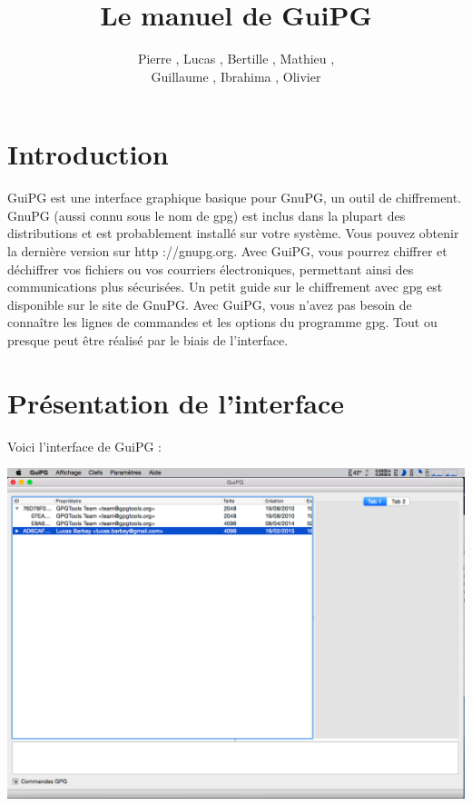 \documentclass[a4paper,11pt,french]{article}
\begin{document}
\title{Le manuel de GuiPG}
\author{Pierre , Lucas , Bertille , Mathieu , \\ Guillaume , Ibrahima , Olivier }
\maketitle

\normalsize
\clearpage
\tableofcontents
\clearpage

\section{Introduction}

GuiPG est une interface graphique basique pour GnuPG, un outil de chiffrement. GnuPG (aussi connu sous le nom de gpg) est inclus dans la plupart des distributions et est probablement installé sur votre système. Vous pouvez obtenir la dernière version sur http ://gnupg.org.
Avec GuiPG, vous pourrez chiffrer et déchiffrer vos fichiers ou vos courriers électroniques, permettant ainsi des communications plus sécurisées. Un petit guide sur le chiffrement avec gpg est disponible sur le site de GnuPG.
Avec GuiPG, vous n’avez pas besoin de connaître les lignes de commandes et les options du programme gpg. Tout ou presque peut être réalisé par le biais de l'interface.

\section{Présentation de l'interface}

Voici l'interface de GuiPG : \bigbreak

\includegraphics[scale=0.3]{interface.png} \bigbreak
\end{document}
